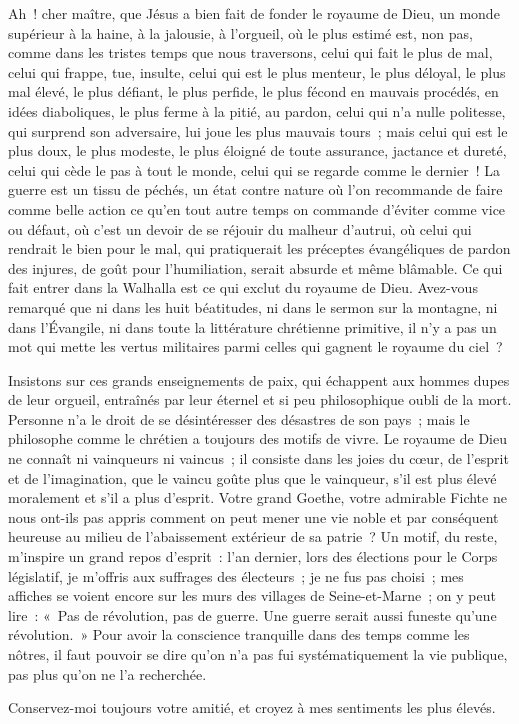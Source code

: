 \documentclass[french,twoside]{book} %
\begin{document}
Ah ! cher maître, que Jésus a bien fait de fonder le royaume de Dieu, un monde supérieur à la haine, à la jalousie, à l’orgueil, où le plus estimé est, non pas, comme dans les tristes temps que nous traversons, celui qui fait le plus de mal, celui qui frappe, tue, insulte, celui qui est le plus menteur, le plus déloyal, le plus mal élevé, le plus défiant, le plus perfide, le plus fécond en mauvais procédés, en idées diaboliques, le plus ferme à la pitié, au pardon, celui qui n’a nulle politesse, qui surprend son adversaire, lui joue les plus mauvais tours ; mais celui qui est le plus doux, le plus modeste, le plus éloigné de toute assurance, jactance et dureté, celui qui cède le pas à tout le monde, celui qui se regarde comme le dernier ! La guerre est un tissu de péchés, un état contre nature où l’on recommande de faire comme belle action ce qu’en tout autre temps on commande d’éviter comme vice ou défaut, où c’est un devoir de se réjouir du malheur d’autrui, où celui qui rendrait le bien pour le mal, qui pratiquerait les préceptes évangéliques de pardon des injures, de goût pour l’humiliation, serait absurde et même blâmable. Ce qui fait entrer dans la Walhalla est ce qui exclut du royaume de Dieu. Avez-vous remarqué que ni dans les huit béatitudes, ni dans le sermon sur la montagne, ni dans l’Évangile, ni dans toute la littérature chrétienne primitive, il n’y a pas un mot qui mette les vertus militaires parmi celles qui gagnent le royaume du ciel ?\par
Insistons sur ces grands enseignements de paix, qui échappent aux hommes dupes de leur orgueil, entraînés par leur éternel et si peu philosophique oubli de la mort. Personne n’a le droit de se désintéresser des désastres de son pays ; mais le philosophe comme le chrétien a toujours des motifs de vivre. Le royaume de Dieu ne connaît ni vainqueurs ni vaincus ; il consiste dans les joies du cœur, de l’esprit et de l’imagination, que le vaincu goûte plus que le vainqueur, s’il est plus élevé moralement et s’il a plus d’esprit. Votre grand Goethe, votre admirable Fichte ne nous ont-ils pas appris comment on peut mener une vie noble et par conséquent heureuse au milieu de l’abaissement extérieur de sa patrie ? Un motif, du reste, m’inspire un grand repos d’esprit : l’an dernier, lors des élections pour le Corps législatif, je m’offris aux suffrages des électeurs ; je ne fus pas choisi ; mes affiches se voient encore sur les murs des villages de Seine-et-Marne ; on y peut lire : « Pas de révolution, pas de guerre. Une guerre serait aussi funeste qu’une révolution. » Pour avoir la conscience tranquille dans des temps comme les nôtres, il faut pouvoir se dire qu’on n’a pas fui systématiquement la vie publique, pas plus qu’on ne l’a recherchée.\par
Conservez-moi toujours votre amitié, et croyez à mes sentiments les plus élevés.
\end{document}
